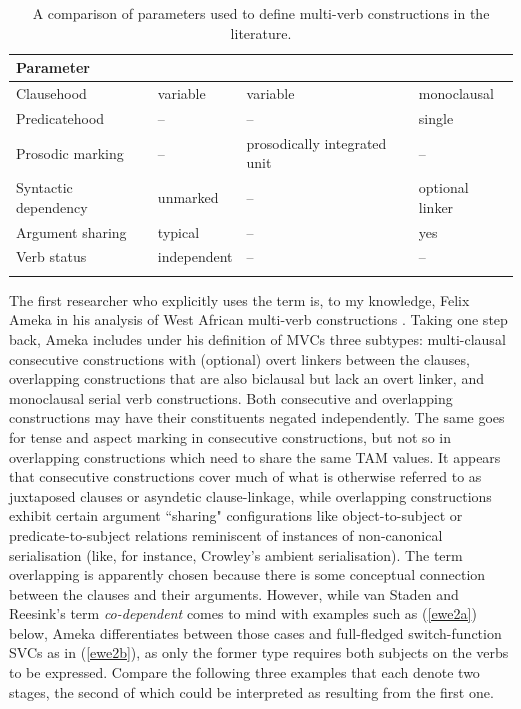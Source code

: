 \begin{table}
\begin{tabularx}{\textwidth}{l QQQ}
\lsptoprule 
Parameter & \citealt{ameka2005multiverb, ameka2006ewe} & \citealt{enfield2008verbs} & \citealt{Aikhenvald2011} \\
\midrule Clausehood & variable & variable & monoclausal \\
Predicatehood & -- & -- & single \\
Prosodic marking & -- & prosodically integrated unit & -- \\
Syntactic dependency & unmarked & -- & optional linker \\
Argument sharing & typical & -- & yes \\
Verb status & independent & -- & -- \\
\lspbottomrule
\end{tabularx}
\caption[Parameters used to define multi-verb constructions]{A comparison of parameters used to define multi-verb constructions in the literature.}
\label{table:multi-verb}
\end{table}

The first researcher who explicitly uses the term is, to my knowledge, Felix Ameka in his analysis of West African multi-verb constructions \citep{ameka2005multiverb, ameka2006ewe}. Taking one step back, Ameka includes under his definition of MVCs three subtypes: multi-clausal consecutive constructions with (optional) overt linkers between the clauses, overlapping constructions that are also biclausal but lack an overt linker, and monoclausal serial verb constructions. Both consecutive and overlapping constructions may have their constituents negated independently. The same goes for tense and aspect marking in consecutive constructions, but not so in overlapping constructions which need to share the same TAM values. It appears that consecutive constructions cover much of what is otherwise referred to as juxtaposed clauses or asyndetic clause-linkage, while overlapping constructions exhibit certain argument ``sharing" configurations like object-to-subject or predicate-to-subject relations reminiscent of instances of non-canonical serialisation (like, for instance, Crowley's ambient serialisation). The term overlapping is apparently chosen because there is some conceptual connection between the clauses and their arguments. However, while van Staden and Reesink's term \textit{co-dependent} comes to mind with examples such as (\ref{ewe2a}) below, Ameka differentiates between those cases and full-fledged switch-function SVCs as in (\ref{ewe2b}), as only the former type requires both subjects on the verbs to be expressed. Compare the following three examples that each denote two stages, the second of which could be interpreted as resulting from the first one. 

